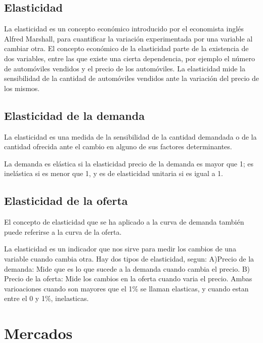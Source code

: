 \documentclass[
]{book}
\begin{document}
\hypertarget{elasticidad}{%
\section{Elasticidad}\label{elasticidad}}

La elasticidad es un concepto económico introducido por el economista inglés Alfred Marshall, para cuantificar la variación experimentada por una variable al cambiar otra. El concepto económico de la elasticidad parte de la existencia de dos variables, entre las que existe una cierta dependencia, por ejemplo el número de automóviles vendidos y el precio de los automóviles. La elasticidad mide la sensibilidad de la cantidad de automóviles vendidos ante la variación del precio de los mismos.

\hypertarget{elasticidad-de-la-demanda}{%
\section{Elasticidad de la demanda}\label{elasticidad-de-la-demanda}}

La elasticidad es una medida de la sensibilidad de la cantidad demandada o de la cantidad ofrecida ante el cambio en alguno de sus factores determinantes.

La demanda es elástica si la elasticidad precio de la demanda es mayor que 1; es inelástica si es menor que 1, y es de elasticidad unitaria si es igual a 1.

\hypertarget{elasticidad-de-la-oferta}{%
\section{Elasticidad de la oferta}\label{elasticidad-de-la-oferta}}

El concepto de elasticidad que se ha aplicado a la curva de demanda también puede referirse a la curva de la oferta.

La elasticidad es un indicador que nos sirve para medir los cambios de una variable cuando cambia otra. Hay dos tipos de elasticidad, segun: A)Precio de la demanda: Mide que es lo que sucede a la demanda cuando cambia el precio. B) Precio de la oferta: Mide los cambios en la oferta cuando varia el precio. Ambas varioaciones cuando son mayores que el 1\% se llaman elasticas, y cuando estan entre el 0 y 1\%, inelasticas.

\hypertarget{mercados}{%
\chapter{Mercados}\label{mercados}}
\end{document}
